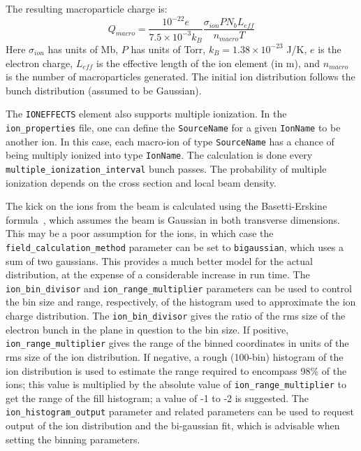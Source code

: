 The resulting macroparticle charge is:
\begin{equation}
Q_{macro} = \frac{10^{-22} e}{7.5\times10^{-3} k_B} \frac{\sigma_{ion} P N_b L_{eff}}{n_{macro} T}
\end{equation}
Here $\sigma_{ion}$ has units of Mb, $P$ has units of Torr, $k_B = 1.38\times10^{-23}$ J/K, $e$ is the electron charge, $L_{eff}$ is the effective length of the ion element (in m), and $n_{macro}$ is the number of macroparticles generated.
The initial ion distribution follows the bunch distribution (assumed to be Gaussian).

The \verb|IONEFFECTS| element also supports multiple ionization.  In the \verb|ion_properties| file, one can define the \verb|SourceName| for a given \verb|IonName| to be another ion.  In this case, each macro-ion of type \verb|SourceName| has a chance of being multiply ionized into type \verb|IonName|.  The calculation is done every \verb|multiple_ionization_interval| bunch passes.  The probability of multiple ionization depends on the cross section and local beam density.



The kick on the ions from the beam is calculated using the
Basetti-Erskine formula~\cite{Bassetti}, which assumes the beam is
Gaussian in both transverse dimensions.  This may be a poor assumption for
the ions, in which case the \verb|field_calculation_method| parameter can be
set to \verb|bigaussian|, which uses a sum of two gaussians. This provides
a much better model for the actual distribution, at the expense of a considerable
increase in run time. The \verb|ion_bin_divisor| and \verb|ion_range_multiplier| parameters can
be used to control the bin size and range, respectively, of the histogram used to 
approximate the ion charge distribution.
The \verb|ion_bin_divisor| gives the ratio of the rms size of the electron bunch
in the plane in question to the bin size.
If positive, \verb|ion_range_multiplier| gives the range of the binned coordinates in 
units of the rms size of the ion distribution.
If negative, a rough (100-bin) histogram of the ion distribution is used to
estimate the range required to encompass 98\% of the ions; this value is multiplied
by the absolute value of \verb|ion_range_multiplier| to get the range of the
fill histogram; a value of -1 to -2 is suggested.
The \verb|ion_histogram_output| parameter and related parameters can be used to 
request output of the ion distribution and the bi-gaussian fit, which is advisable
when setting the binning parameters.

